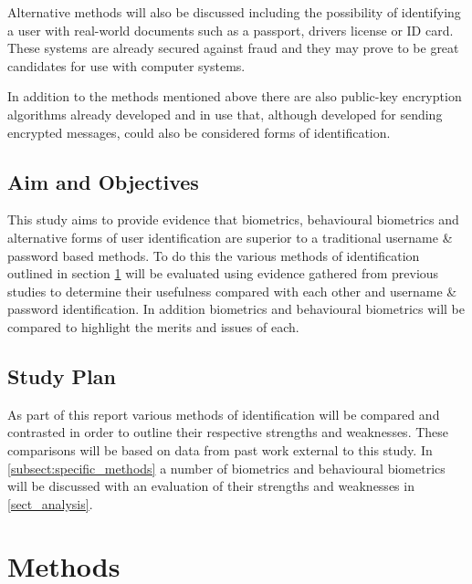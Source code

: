 \documentclass[12pt]{article}
\begin{document}
	Alternative methods will also be discussed including the possibility of identifying a user with real-world documents such as a passport, drivers license or ID card. These systems are already secured against fraud and they may prove to be great candidates for use with computer systems.

	In addition to the methods mentioned above there are also public-key encryption algorithms already developed and in use that, although developed for sending encrypted messages, could also be considered forms of identification.
	
	\subsection{Aim and Objectives} 
	This study aims to provide evidence that biometrics, behavioural biometrics and alternative forms of user identification are superior to a traditional username \& password based methods.
	To do this the various methods of identification outlined in section \ref{sect_methods} will be evaluated using evidence gathered from previous studies to determine their usefulness compared with each other and username \& password identification.
	In addition biometrics and behavioural biometrics will be compared to highlight the merits and issues of each.
	
	\subsection{Study Plan}
	As part of this report various methods of identification will be compared and contrasted in order to outline their respective strengths and weaknesses. These comparisons will be based on data from past work external to this study.
	In \ref{subsect:specific_methods} a number of biometrics and behavioural biometrics will be discussed with an evaluation of their strengths and weaknesses in \ref{sect_analysis}.
	
	\section{Methods}
	\label{sect_methods}
\end{document}
